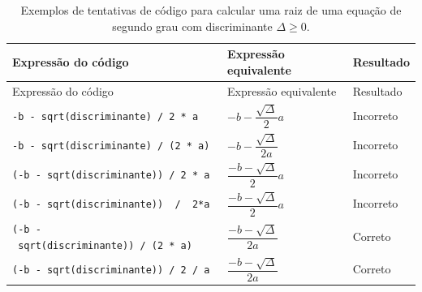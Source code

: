 \documentclass[
  11pt,
  a4paper,
]{scrbook}
\begin{document}
\begin{longtable}[]{@{}
  >{\centering\arraybackslash}p{}
  >{\centering\arraybackslash}p{}
  >{\centering\arraybackslash}p{}@{}}
\caption{Exemplos de tentativas de código para calcular uma raiz de uma
equação de segundo grau com discriminante
\(\Delta \geq 0\).}\label{tbl-tentativas-raiz-equacao}\tabularnewline
\toprule\noalign{}
\begin{minipage}[b]{\linewidth}\centering
Expressão do código
\end{minipage} & \begin{minipage}[b]{\linewidth}\centering
Expressão equivalente
\end{minipage} & \begin{minipage}[b]{\linewidth}\centering
Resultado
\end{minipage} \\
\midrule\noalign{}
\endfirsthead
\toprule\noalign{}
\begin{minipage}[b]{\linewidth}\centering
Expressão do código
\end{minipage} & \begin{minipage}[b]{\linewidth}\centering
Expressão equivalente
\end{minipage} & \begin{minipage}[b]{\linewidth}\centering
Resultado
\end{minipage} \\
\midrule\noalign{}
\endhead
\bottomrule\noalign{}
\endlastfoot
\texttt{-b\ -\ sqrt(discriminante)\ /\ 2\ *\ a} &
\(-b - \dfrac{\sqrt{\Delta}}{2} a\) & Incorreto \\
\texttt{-b\ -\ sqrt(discriminante)\ /\ (2\ *\ a)} &
\(-b - \dfrac{\sqrt{\Delta}}{2a}\) & Incorreto \\
\texttt{(-b\ -\ sqrt(discriminante))\ /\ 2\ *\ a} &
\(\dfrac{-b - \sqrt{\Delta}}{2} a\) & Incorreto \\
\texttt{(-b\ -\ sqrt(discriminante))\ \ /\ \ 2*a} &
\(\dfrac{-b - \sqrt{\Delta}}{2} a\) & Incorreto \\
\texttt{(-b\ -\ sqrt(discriminante))\ /\ (2\ *\ a)} &
\(\dfrac{-b - \sqrt{\Delta}}{2a}\) & Correto \\
\texttt{(-b\ -\ sqrt(discriminante))\ /\ 2\ /\ a} &
\(\dfrac{-b - \sqrt{\Delta}}{2a}\) & Correto \\
\end{longtable}
\end{document}
